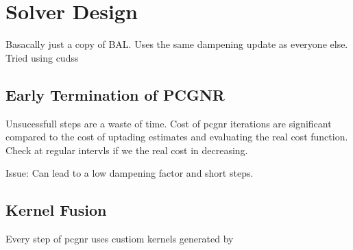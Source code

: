 \section{Solver Design}
Basacally just a copy of BAL.
Uses the same dampening update as everyone else.
Tried using \gls{cudss}

\subsection{Early Termination of PCGNR}
Unsucessfull steps are a waste of time.
Cost of \gls{pcgnr} iterations are significant compared to the cost of uptading estimates and evaluating the real cost function.
Check at regular intervls if we the real cost in decreasing.

Issue: Can lead to a low dampening factor and short steps.

\subsection{Kernel Fusion}
Every step of \gls{pcgnr} uses custiom \cuda kernels generated by \caspar